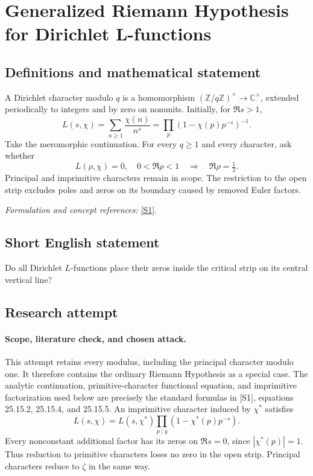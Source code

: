 \documentclass[11pt]{article}
\begin{document}
\section*{\texorpdfstring{Generalized Riemann Hypothesis for Dirichlet L-functions}{Generalized Riemann Hypothesis for Dirichlet L-functions}}\label{statement}
\subsection{Definitions and mathematical statement}
A Dirichlet character modulo $q$ is a homomorphism $({\mathbb{Z}}/q{\mathbb{Z}})^\times\to{\mathbb{C}}^\times$, extended periodically to integers and by zero on nonunits. Initially, for $\Re s>1$,
\[
 L(s,\chi)=\sum_{n\ge1}\frac{\chi(n)}{n^s}=\prod_p(1-\chi(p)p^{-s})^{-1}.
\]
Take the meromorphic continuation. For every $q\ge1$ and every character, ask whether
\[
 L(\rho,\chi)=0,\quad0<\Re\rho<1\quad\Longrightarrow\quad\Re\rho=\tfrac12.
\]
Principal and imprimitive characters remain in scope. The restriction to the open strip excludes poles and zeros on its boundary caused by removed Euler factors.
\par\smallskip\textit{Formulation and concept references:} \href{https://dlmf.nist.gov/25.15}{[S1]}.

\subsection{Short English statement}
Do all Dirichlet $L$-functions place their zeros inside the critical strip on its central vertical line?
\subsection{Research attempt}

\paragraph{Scope, literature check, and chosen attack.}
This attempt retains every modulus, including the principal character modulo
one. It therefore contains the ordinary Riemann Hypothesis as a special case.
The analytic continuation, primitive-character functional equation, and
imprimitive factorization used below are precisely the standard formulas
in [S1], equations 25.15.2, 25.15.4, and 25.15.5. An imprimitive character
induced by $\chi^*$ satisfies
\[
 L(s,\chi)=L(s,\chi^*)\prod_{p\mid q}(1-\chi^*(p)p^{-s}).
\]
Every nonconstant additional factor has its zeros on $\Re s=0$, since
$|\chi^*(p)|=1$. Thus reduction to primitive characters loses no zero in the
open strip. Principal characters reduce to $\zeta$ in the same way.
\end{document}
